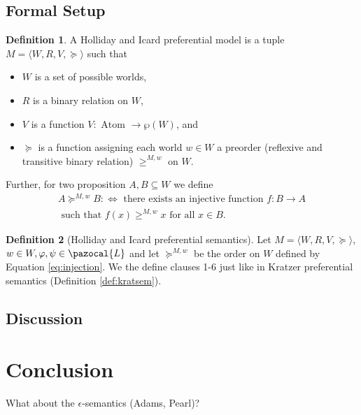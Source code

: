 \documentclass{article}
\theoremstyle{definition}
\newtheorem{definition}{Definition}
\renewcommand{\L}{\pazocal{L}}
\begin{document}
\subsection{Formal Setup}
\begin{definition}
    A Holliday and Icard preferential model is a tuple $M = {\langle
      W,R,V,\succeq\rangle}$ such that
    \begin{itemize}[nosep]
        \renewcommand\labelitemi{--}
      \item $W$ is a set of possible worlds,
      \item $R$ is a binary relation on $W$,
      \item $V$ is a function $V: \text{ Atom } \rightarrow \wp(W)$, and
      \item $\succeq$ is a function assigning each world $w \in W$ a preorder
        (reflexive and transitive binary relation) $\geq^{M,w}$ on $W$. 
    \end{itemize}
\end{definition}
Further, for two proposition $A,B \subseteq W$ we define
\begin{multline}
    \label{eq:injection}A \succeq^{M,w} B :\iff \text{ there exists an injective function } f: B \rightarrow A \\ \text{ such that } f(x) \geq^{M,w} x \text{ for all } x \in B.
\end{multline}

\begin{definition}[Holliday and Icard preferential semantics] Let $M = {\langle
      W,R,V,\succeq \rangle}$, $w \in W, \varphi,\psi \in \L$ and let $\succeq^{M,w}$ be the order on $W$ defined by Equation \ref{eq:injection}. We the define clauses 1-6 just like in Kratzer preferential semantics (Definition \ref{def:kratsem}).
\end{definition}



\subsection{Discussion}
\section{Conclusion}
What about the $\epsilon$-semantics (Adams, Pearl)? 
\nocite{hamblin59_modal_probab,holliday13_measur,harrison-trainor17_prefer,kratzer91_modal,lassiter10_gradab,yalcin10_probab_operat,kratzer98_seman}
 \printbibliography
\end{document}
